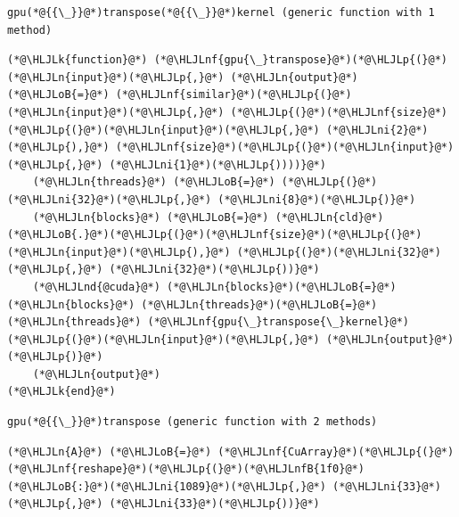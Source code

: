 \documentclass[12pt,a4paper]{article}
\newcommand{\HLJLk}[1]{\textcolor[RGB]{148,91,176}{\textbf{#1}}}
\newcommand{\HLJLn}[1]{#1}
\newcommand{\HLJLnd}[1]{\textcolor[RGB]{214,102,97}{#1}}
\newcommand{\HLJLnf}[1]{\textcolor[RGB]{66,102,213}{#1}}
\newcommand{\HLJLnfB}[1]{\textcolor[RGB]{59,151,46}{#1}}
\newcommand{\HLJLni}[1]{\textcolor[RGB]{59,151,46}{#1}}
\newcommand{\HLJLoB}[1]{\textcolor[RGB]{102,102,102}{\textbf{#1}}}
\newcommand{\HLJLp}[1]{#1}
\begin{document}
\begin{lstlisting}
gpu(*@{{\_}}@*)transpose(*@{{\_}}@*)kernel (generic function with 1 method)
\end{lstlisting}


\begin{lstlisting}
(*@\HLJLk{function}@*) (*@\HLJLnf{gpu{\_}transpose}@*)(*@\HLJLp{(}@*)(*@\HLJLn{input}@*)(*@\HLJLp{,}@*) (*@\HLJLn{output}@*) (*@\HLJLoB{=}@*) (*@\HLJLnf{similar}@*)(*@\HLJLp{(}@*)(*@\HLJLn{input}@*)(*@\HLJLp{,}@*) (*@\HLJLp{(}@*)(*@\HLJLnf{size}@*)(*@\HLJLp{(}@*)(*@\HLJLn{input}@*)(*@\HLJLp{,}@*) (*@\HLJLni{2}@*)(*@\HLJLp{),}@*) (*@\HLJLnf{size}@*)(*@\HLJLp{(}@*)(*@\HLJLn{input}@*)(*@\HLJLp{,}@*) (*@\HLJLni{1}@*)(*@\HLJLp{))))}@*)
    (*@\HLJLn{threads}@*) (*@\HLJLoB{=}@*) (*@\HLJLp{(}@*)(*@\HLJLni{32}@*)(*@\HLJLp{,}@*) (*@\HLJLni{8}@*)(*@\HLJLp{)}@*)
    (*@\HLJLn{blocks}@*) (*@\HLJLoB{=}@*) (*@\HLJLn{cld}@*)(*@\HLJLoB{.}@*)(*@\HLJLp{(}@*)(*@\HLJLnf{size}@*)(*@\HLJLp{(}@*)(*@\HLJLn{input}@*)(*@\HLJLp{),}@*) (*@\HLJLp{(}@*)(*@\HLJLni{32}@*)(*@\HLJLp{,}@*) (*@\HLJLni{32}@*)(*@\HLJLp{))}@*)
    (*@\HLJLnd{@cuda}@*) (*@\HLJLn{blocks}@*)(*@\HLJLoB{=}@*)(*@\HLJLn{blocks}@*) (*@\HLJLn{threads}@*)(*@\HLJLoB{=}@*)(*@\HLJLn{threads}@*) (*@\HLJLnf{gpu{\_}transpose{\_}kernel}@*)(*@\HLJLp{(}@*)(*@\HLJLn{input}@*)(*@\HLJLp{,}@*) (*@\HLJLn{output}@*)(*@\HLJLp{)}@*)
    (*@\HLJLn{output}@*)
(*@\HLJLk{end}@*)
\end{lstlisting}

\begin{lstlisting}
gpu(*@{{\_}}@*)transpose (generic function with 2 methods)
\end{lstlisting}


\begin{lstlisting}
(*@\HLJLn{A}@*) (*@\HLJLoB{=}@*) (*@\HLJLnf{CuArray}@*)(*@\HLJLp{(}@*)(*@\HLJLnf{reshape}@*)(*@\HLJLp{(}@*)(*@\HLJLnfB{1f0}@*)(*@\HLJLoB{:}@*)(*@\HLJLni{1089}@*)(*@\HLJLp{,}@*) (*@\HLJLni{33}@*)(*@\HLJLp{,}@*) (*@\HLJLni{33}@*)(*@\HLJLp{))}@*)
\end{lstlisting}
\end{document}

